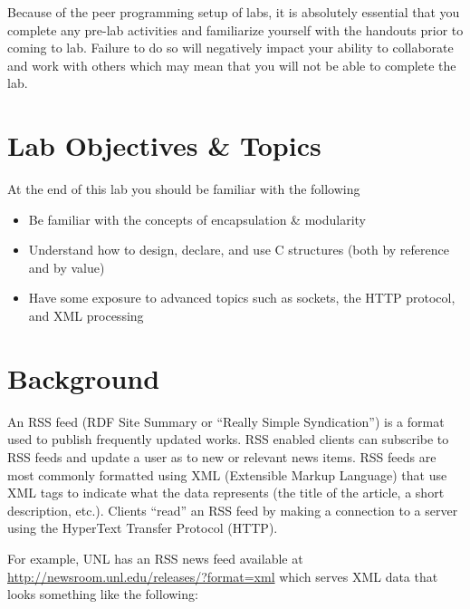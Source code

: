 \documentclass[12pt]{scrartcl}
\begin{document}
Because of the peer programming setup of labs, it is absolutely 
essential that you complete any pre-lab activities and familiarize
yourself with the handouts prior to coming to lab.  Failure to do
so will negatively impact your ability to collaborate and work with 
others which may mean that you will not be able to complete the
lab.  


\section{Lab Objectives \& Topics}
At the end of this lab you should be familiar with the following
\begin{itemize}
  \item Be familiar with the concepts of encapsulation \& modularity
  \item Understand how to design, declare, and use C structures 
  	(both by reference and by value)
  \item Have some exposure to advanced topics such as sockets, 
	the HTTP protocol, and XML processing
\end{itemize}

\section{Background}

An RSS feed (RDF Site Summary or ``Really Simple Syndication'') 
is a format used to publish frequently updated works.  RSS enabled 
clients can subscribe to RSS feeds and update a user as to new or 
relevant news items.  RSS feeds are most commonly formatted using 
XML (Extensible Markup Language) that use XML tags to indicate 
what the data represents (the title of the article, a short description, 
etc.).  Clients ``read'' an RSS feed by making a connection to a server 
using the HyperText Transfer Protocol (HTTP).

For example, UNL has an RSS news feed available at \url{http://newsroom.unl.edu/releases/?format=xml} 
which serves XML data that looks something like the following:
\end{document}
